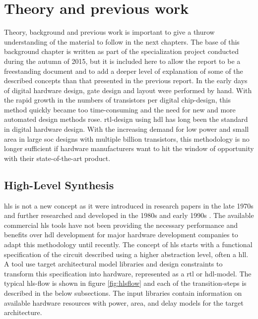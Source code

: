 \chapter{\label{chp:background}Theory and previous work}
Theory, background and previous work is important to give a thurow understanding of the material to follow in the next chapters. The base of this background chapter is written as part of the specialization project conducted during the autumn of 2015, but it is included here to allow the report to be a freestanding document and to add a deeper level of explanation of some of the described concepts than that presented in the previous report. 
In the early days of digital hardware design, gate design and layout were performed by hand. With the rapid growth in the numbers of transistors per digital chip-design, this method quickly became too time-consuming and the need for new and more automated design methods rose. \gls{rtl}-design using \gls{hdl} has long been the standard in digital hardware design. With the increasing demand for low power and small area in large \gls{soc} designs with multiple billion transistors, this methodology is no longer sufficient if hardware manufacturers want to hit the window of opportunity with their state-of-the-art product.

\section{\label{sec:hls}High-Level Synthesis}

\gls{hls} is not a new concept as it were introduced in research papers in the late 1970s and further researched and developed in the 1980s and early 1990s \cite{martin2009high}. The available commercial \gls{hls} tools have not been providing the necessary performance and benefits over \gls{hdl} development for major hardware development companies to adapt this methodology until recently.
The concept of \gls{hls} starts with a functional specification of the circuit described using a higher abstraction level, often a \gls{hll}. A tool use target architectural model libraries and design constraints to transform this specification into hardware, represented as a \gls{rtl} or \gls{hdl}-model. The typical \gls{hls}-flow is shown in figure \ref{fig:hlsflow} and each of the transition-steps is described in the below subsections. The input libraries contain information on available hardware resources with power, area, and delay models for the target architecture.

